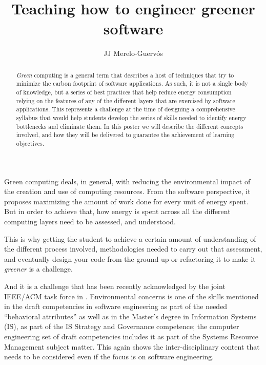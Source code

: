 \documentclass[a4paper]{article}
\begin{document}
\title{Teaching how to engineer greener software}

\author{JJ Merelo-Guervós}


\maketitle

\begin{abstract}
{\em Green} computing is a general term that describes a host of techniques that
try to minimize the carbon footprint of software applications. As such, it is
not a single body of knowledge, but a series of best practices that help reduce
energy consumption relying on the features of any of the different layers that
are exercised by software applications. This represents a challenge at the
time of designing a comprehensive syllabus that would help students develop the
series of skills needed to identify energy bottlenecks and eliminate them. In
this poster we will describe the different concepts involved, and how they will
be delivered to guarantee the achievement of learning objectives.
\end{abstract}

Green computing \cite{kurp2008green} deals, in general, with reducing the
environmental impact of the creation and use of computing resources. From the
software perspective, it proposes maximizing the amount of work done for every
unit of energy spent. But in order to achieve that, how energy is spent across
all the different computing layers need to be assessed, and understood.

This is why getting the student to achieve a certain amount of understanding of
the different process involved, methodologies needed to carry out that
assessment, and eventually design your code from the ground up or refactoring it
to make it {\em greener} is a challenge.

And it is a challenge that has been recently acknowledged by the joint IEEE/ACM
task force in \cite{cc2020}. Environmental concerns is one of the skills
mentioned in the draft competencies in software engineering as part of the
needed ``behavioral attributes'' as well as in the
Master's degree in Information Systems (IS), as part of the IS Strategy and
Governance competence; the computer engineering set of draft competencies
includes it as part of the Systems Resource Management subject matter. This
again shows the inter-disciplinary content that needs to be considered even if
the focus is on software engineering.
\end{document}

